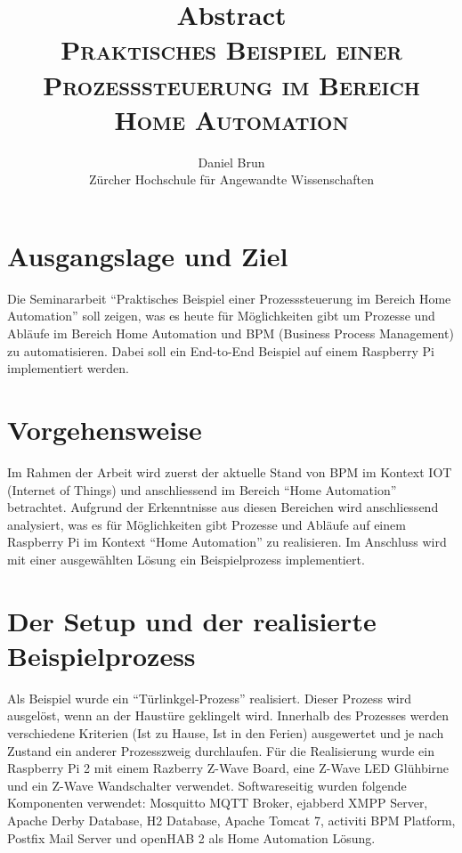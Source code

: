 \documentclass[11pt,a4paper,ngerman]{article}
\begin{document}
\rmfamily  
\title{\textbf{Abstract} \\ \rmfamily  \textsc{Praktisches Beispiel einer Prozesssteuerung im Bereich Home Automation}}
\author{Daniel Brun\\
Zürcher Hochschule für Angewandte Wissenschaften}
\date{} %
\maketitle\thispagestyle{empty} %

\rmfamily\normalsize
\setlength{\parindent}{0pt}
\section*{Ausgangslage und Ziel}
Die Seminararbeit "`Praktisches Beispiel einer Prozesssteuerung im Bereich Home Automation"' soll zeigen, was es heute für Möglichkeiten gibt um Prozesse und Abläufe im Bereich Home Automation und BPM (Business Process Management) zu automatisieren. Dabei soll ein End-to-End Beispiel auf einem Raspberry Pi implementiert werden.

\section*{Vorgehensweise}
Im Rahmen der Arbeit wird zuerst der aktuelle Stand von BPM im Kontext IOT (Internet of Things) und anschliessend im Bereich "`Home Automation"' betrachtet. Aufgrund der Erkenntnisse aus diesen Bereichen wird anschliessend analysiert, was es für Möglichkeiten gibt Prozesse und Abläufe auf einem Raspberry Pi im Kontext "`Home Automation"' zu realisieren. Im Anschluss wird mit einer ausgewählten Lösung ein Beispielprozess implementiert.

\section*{Der Setup und der realisierte Beispielprozess}
Als Beispiel wurde ein "`Türlinkgel-Prozess"' realisiert. Dieser Prozess wird ausgelöst, wenn an der Haustüre geklingelt wird. Innerhalb des Prozesses werden verschiedene Kriterien (Ist zu Hause, Ist in den Ferien) ausgewertet und je nach Zustand ein anderer Prozesszweig durchlaufen. Für die Realisierung wurde ein Raspberry Pi 2 mit einem Razberry Z-Wave Board, eine Z-Wave LED Glühbirne und ein Z-Wave Wandschalter verwendet. Softwareseitig wurden folgende Komponenten verwendet: Mosquitto MQTT Broker, ejabberd XMPP Server, Apache Derby Database, H2 Database, Apache Tomcat 7, activiti BPM Platform, Postfix Mail Server und openHAB 2 als Home Automation Lösung.
\end{document}

